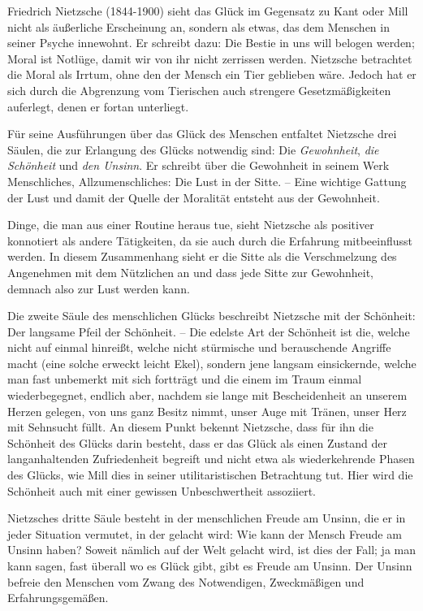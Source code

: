 Friedrich Nietzsche (1844-1900) sieht das Glück im Gegensatz zu Kant oder Mill nicht als äußerliche Erscheinung an, sondern als etwas, das dem Menschen in seiner Psyche innewohnt. 
Er schreibt dazu: \glqq Die Bestie in uns will belogen werden; Moral ist Notlüge, damit wir von ihr nicht zerrissen werden.\grqq{}\cite[S.\,57]{FN06}
Nietzsche betrachtet die Moral als Irrtum, ohne den der Mensch ein Tier geblieben wäre. 
Jedoch hat er sich durch die Abgrenzung vom Tierischen auch strengere Gesetzmäßigkeiten auferlegt, denen er fortan unterliegt.

Für seine Ausführungen über das Glück des Menschen entfaltet Nietzsche drei Säulen, die zur Erlangung des Glücks notwendig sind: Die \textit{Gewohnheit}, \textit{die Schönheit} und \textit{den Unsinn}. 
Er schreibt über die Gewohnheit in seinem Werk \glqq Menschliches, Allzumenschliches\grqq{}: \glqq Die Lust in der Sitte. -- Eine wichtige Gattung der Lust und damit der Quelle der Moralität entsteht aus der Gewohnheit.\grqq{}\cite[S.\,84]{FN06}

Dinge, die man aus einer Routine heraus tue, sieht Nietzsche als positiver konnotiert als andere Tätigkeiten, da sie auch durch die Erfahrung mitbeeinflusst werden. 
In diesem Zusammenhang sieht er die Sitte als die Verschmelzung des Angenehmen mit dem Nützlichen an und dass jede Sitte zur Gewohnheit, demnach also zur Lust werden kann.

Die zweite Säule des menschlichen Glücks beschreibt Nietzsche mit der Schönheit: \glqq Der langsame Pfeil der Schönheit. -- Die edelste Art der Schönheit ist die, welche nicht auf einmal hinreißt, welche nicht stürmische und berauschende Angriffe macht (eine solche erweckt leicht Ekel), sondern jene langsam einsickernde, welche man fast unbemerkt mit sich fortträgt und die einem im Traum einmal wiederbegegnet, endlich aber, nachdem sie lange mit Bescheidenheit an unserem Herzen gelegen, von uns ganz Besitz nimmt, unser Auge mit Tränen, unser Herz mit Sehnsucht füllt.\grqq{}\cite[S.\,131]{FN06}
An diesem Punkt bekennt Nietzsche, dass für ihn die Schönheit des Glücks darin besteht, dass er das Glück als einen Zustand der langanhaltenden Zufriedenheit begreift und nicht etwa als wiederkehrende Phasen des Glücks, wie Mill dies in seiner utilitaristischen Betrachtung tut. 
Hier wird die Schönheit auch mit einer gewissen Unbeschwertheit assoziiert.

Nietzsches dritte Säule besteht in der menschlichen Freude am Unsinn, die er in jeder Situation vermutet, in der gelacht wird: \glqq Wie kann der Mensch Freude am Unsinn haben? Soweit nämlich auf der Welt gelacht wird, ist dies der Fall; ja man kann sagen, fast überall wo es Glück gibt, gibt es Freude am Unsinn.\grqq{}\cite[S.\,159]{FN06}
Der Unsinn befreie den Menschen vom Zwang des \glqq Notwendigen, Zweckmäßigen und Erfahrungsgemäßen\grqq{}.\cite[S.\,159]{FN06}


